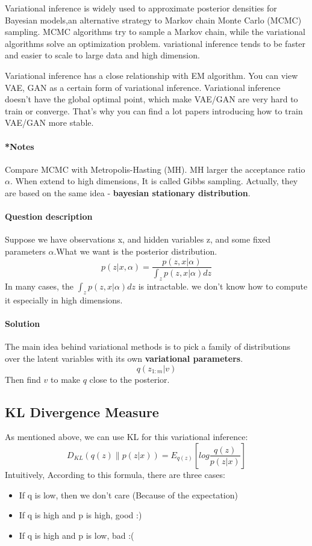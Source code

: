 \documentclass{article}
\begin{document}
Variational inference is widely used to approximate posterior densities for Bayesian models,an alternative strategy to Markov chain Monte Carlo (MCMC) sampling. MCMC algorithms try to sample a Markov chain, while the variational algorithms solve an optimization problem. variational inference tends to be faster and easier to scale to large data and high dimension.

Variational inference has a close relationship with EM algorithm. You can view VAE, GAN as a certain form of variational inference. Variational inference doesn't have the global optimal point, which make VAE/GAN are very hard to train or converge. That's why you can find a lot papers introducing how to train VAE/GAN more stable.
\paragraph{*Notes} Compare MCMC with Metropolis-Hasting (MH). MH larger the acceptance ratio $\alpha$. When extend to high dimensions, It is called Gibbs sampling. Actually, they are based on the same idea - \textbf{bayesian stationary distribution}. 

\paragraph{Question description} Suppose we have observations x, and hidden variables z, and some fixed parameters $\alpha$.What we want is the posterior distribution.
$$p(z|x,\alpha)=\frac{p(z,x|\alpha)}{\int_z p(z,x|\alpha)dz}$$
In many cases, the $\int_z p(z,x|\alpha)dz$ is intractable. we don't know how to compute it especially in high dimensions.
\paragraph{Solution} The main idea behind variational methods is to pick a family of distributions over the latent variables with its own \textbf{variational parameters}.
$$q(z_{1:m}|v)$$
Then find $v$ to make $q$ close to the posterior.
\subsection{KL Divergence Measure}
As mentioned above, we can use KL for this variational inference:
$$D_{KL}(q(z) \parallel p(z|x))=E_{q(z)} \left[ log \frac{q(z)}{p(z|x)} \right]$$
Intuitively, According to this formula, there are three cases:
\begin{itemize}
\item If q is low, then we don't care (Because of the expectation)
\item If q is high and p is high, good :)
\item If q is high and p is low, bad :(
\end{itemize}
\end{document}
